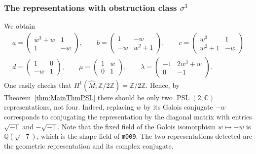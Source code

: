 \documentclass[11pt]{amsart}
\theoremstyle{plain}
\theoremstyle{definition}
\numberwithin{equation}{section}
\newcommand{\Z}{\mathbb Z}
\newcommand{\Q}{\mathbb Q}
\newcommand{\C}{\mathbb C}
\DeclareMathOperator{\PSL}{PSL}
\begin{document}
\subsubsection{The representations with obstruction class $\sigma^3$}
We obtain
\begin{equation}
\begin{gathered}
a=\begin{pmatrix}w^3+w&1\\1&-w\end{pmatrix},\qquad b=\begin{pmatrix}1&-w\\-w&w^2+1\end{pmatrix},\qquad c=\begin{pmatrix}w^3&1\\w^2+1&-w\end{pmatrix}\\
d=\begin{pmatrix}1&0\\-w&1\end{pmatrix},\qquad \mu=\begin{pmatrix}1&w\\0&1\end{pmatrix},\qquad \lambda=\begin{pmatrix}-1&2w^3+w\\0&-1\end{pmatrix}.
\end{gathered}
\end{equation}
One easily checks that $H^1(\widehat M;\Z/2\Z)=\Z/2\Z$. Hence, by Theorem~\ref{thm:MainThmPSL} there should be only two $\PSL(2,\C)$ representations, not four. Indeed, replacing $w$ by its Galois conjugate $-w$ corresponds to conjugating the representation by the diagonal matrix with entries $\sqrt{-1}$ and $-\sqrt{-1}$. Note that the fixed field of the Galois isomorphism $w\mapsto -w$ is $\Q(\sqrt{-7})$, which is the shape field of \texttt{m009}. The two representations detected are the geometric representation and its complex conjugate.
\end{document}
